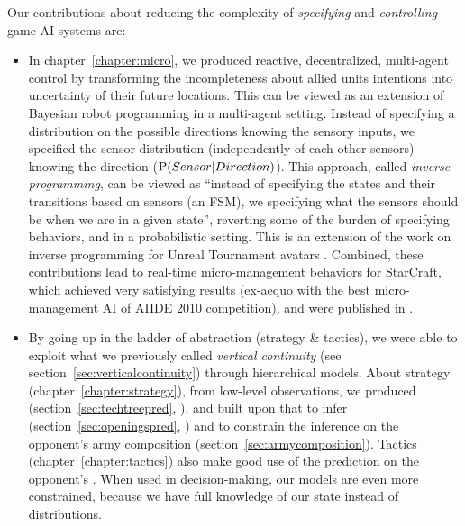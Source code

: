 Our contributions about reducing the complexity of \textit{specifying} and \textit{controlling} game AI systems are:
\begin{itemize}
    \item In chapter~\ref{chapter:micro}, we produced reactive, decentralized, multi-agent control by transforming the incompleteness about allied units intentions into uncertainty of their future locations. This can be viewed as an extension of Bayesian robot programming \citep{Lebeltel04} in a multi-agent setting. Instead of specifying a distribution on the possible directions knowing the sensory inputs, we specified the sensor distribution (independently of each other sensors) knowing the direction ($\mathrm{P}(Sensor|Direction)$). This approach, called \textit{inverse programming}, can be viewed as ``instead of specifying the states and their transitions based on sensors (an FSM), we specifying what the sensors should be when we are in a given state'', reverting some of the burden of specifying behaviors, and in a probabilistic setting. This is an extension of the work on inverse programming for Unreal Tournament avatars \citep{LeHy04}. Combined, these contributions lead to real-time micro-management behaviors for StarCraft, which achieved very satisfying results (ex-aequo with the best micro-management AI of AIIDE 2010 competition), and were published in \citep{SYNNAEVE:Micro}.

    \item By going up in the ladder of abstraction (strategy \& tactics), we were able to exploit what we previously called \textit{vertical continuity} (see section~\ref{sec:verticalcontinuity}) through hierarchical models. About strategy (chapter~\ref{chapter:strategy}), from low-level observations, we produced  (section~\ref{sec:techtreepred}, \citep{SYNNAEVE:StratPred}), and built upon that to infer  (section~\ref{sec:openingspred}, \citep{SYNNAEVE:OpeningPred}) and to constrain the inference on the opponent's army composition (section~\ref{sec:armycomposition}). Tactics (chapter~\ref{chapter:tactics}) also make good use of the prediction on the opponent's . When used in decision-making, our models are even more constrained, because we have full knowledge of our state instead of distributions.


\end{itemize}

